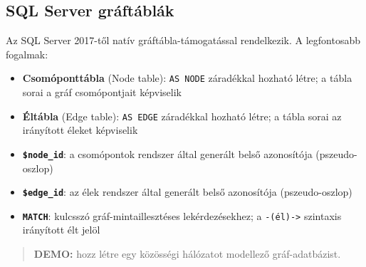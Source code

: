 \documentclass[
  magyar,
]{article}
\providecommand{\tightlist}{%
  \setlength{\itemsep}{0pt}\setlength{\parskip}{0pt}}
\begin{document}
\subsection{SQL Server gráftáblák}\label{sql-server-gruxe1ftuxe1bluxe1k}

Az SQL Server 2017-től natív gráftábla-támogatással rendelkezik. A
legfontosabb fogalmak:

\begin{itemize}
\tightlist
\item
  \textbf{Csomóponttábla} (Node table): \texttt{AS\ NODE} záradékkal
  hozható létre; a tábla sorai a gráf csomópontjait képviselik
\item
  \textbf{Éltábla} (Edge table): \texttt{AS\ EDGE} záradékkal hozható
  létre; a tábla sorai az irányított éleket képviselik
\item
  \textbf{\texttt{\$node\_id}}: a csomópontok rendszer által generált
  belső azonosítója (pszeudo-oszlop)
\item
  \textbf{\texttt{\$edge\_id}}: az élek rendszer által generált belső
  azonosítója (pszeudo-oszlop)
\item
  \textbf{\texttt{MATCH}}: kulcsszó gráf-mintaillesztéses
  lekérdezésekhez; a \texttt{-(él)-\textgreater{}} szintaxis irányított
  élt jelöl
\end{itemize}

\begin{quote}
\textbf{DEMO:} hozz létre egy közösségi hálózatot modellező
gráf-adatbázist.
\end{quote}
\end{document}
